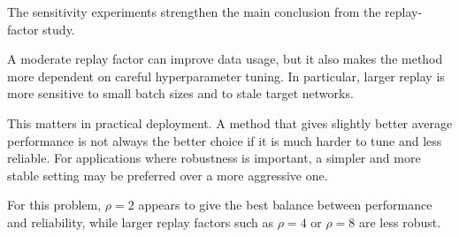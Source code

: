 \documentclass[11pt,a4paper]{article}
\begin{document}
The sensitivity experiments strengthen the main conclusion from the replay-factor study.

A moderate replay factor can improve data usage, but it also makes the method more dependent on careful hyperparameter tuning. In particular, larger replay is more sensitive to small batch sizes and to stale target networks.

This matters in practical deployment. A method that gives slightly better average performance is not always the better choice if it is much harder to tune and less reliable. For applications where robustness is important, a simpler and more stable setting may be preferred over a more aggressive one.

For this problem, \(\rho=2\) appears to give the best balance between performance and reliability, while larger replay factors such as \(\rho=4\) or \(\rho=8\) are less robust.
\clearpage
\end{document}

